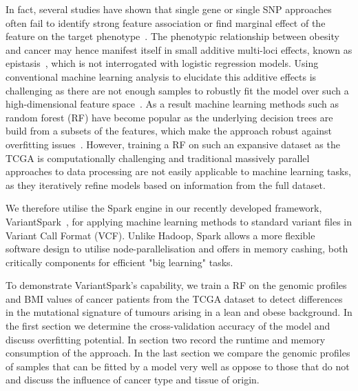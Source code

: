 \documentclass{llncs}
\newcommand{\variantSpark}{{\sc VariantSpark}}
\begin{document}
{In fact, several studies have shown that single gene or single SNP approaches often fail to identify strong feature association or find marginal effect of the feature on the target phenotype~\cite{Bureau2005,Yoo2012,Qi2012}. 
The phenotypic relationship between obesity and cancer may hence manifest itself in small additive multi-loci effects, known as epistasis~\cite{Mackay2014}, which is not interrogated with logistic regression models.
Using conventional machine learning analysis to elucidate this additive effects is challenging as there are not enough samples to robustly fit the model over such a high-dimensional feature space~\cite{Chen2012}. 
As a result machine learning methods such as random forest (RF) have become popular as the underlying decision trees are build from a subsets of the features, which make the approach robust against overfitting issues~\cite{Breiman2001}. 
However, training a RF on such an expansive dataset as the TCGA is computationally challenging and traditional massively parallel approaches to data processing are not easily applicable to machine learning tasks, as they iteratively refine models based on information from the full dataset. 

We therefore utilise the {\sc Spark} engine in our recently developed framework, \variantSpark~\cite{OBrien}, for applying machine learning methods to standard variant files in Variant Call Format (VCF). 
Unlike {\sc Hadoop}, {\sc Spark} allows a more flexible software design to utilise node-parallelisation and offers in memory cashing, both critically components for efficient "big learning" tasks. 

To demonstrate \variantSpark's capability, we train a RF on the genomic profiles and BMI values of cancer patients from the TCGA dataset to detect differences in the mutational signature of tumours arising in a lean and obese background. 
In the first section we determine the cross-validation accuracy of the model and discuss overfitting potential. 
In section two record the runtime and memory consumption of the approach. 
In the last section we compare the genomic profiles of samples that can be fitted by a model very well as oppose to those that do not and discuss the influence of cancer type and tissue of origin. 









}
\end{document}
